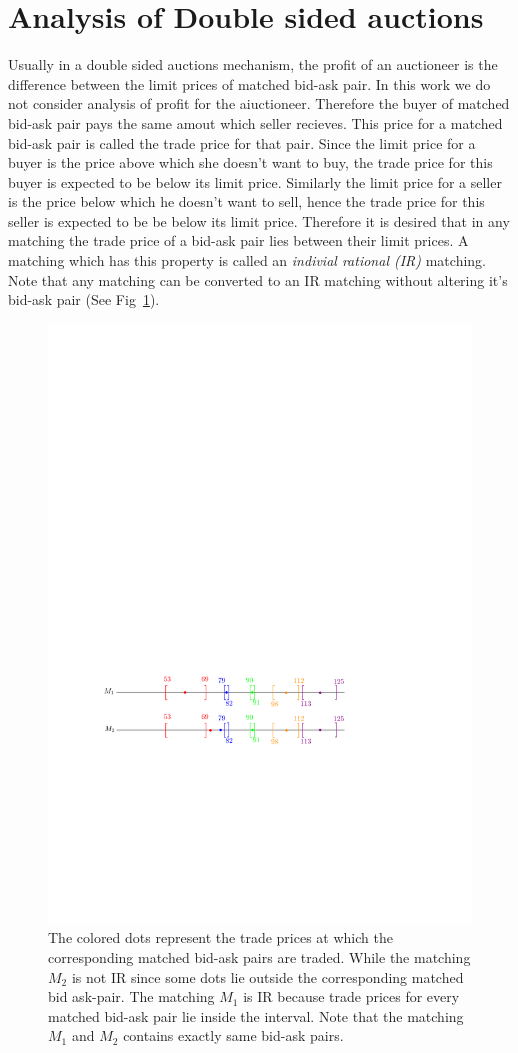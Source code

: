 \documentclass[a4paper,UKenglish,cleveref, autoref]{lipics-v2019}
\begin{document}
\section{Analysis of Double sided auctions}
Usually in a double sided auctions mechanism, the profit of an auctioneer is the difference between the limit prices of matched bid-ask pair. In this work we do not consider analysis of profit for the aiuctioneer. Therefore the buyer of matched bid-ask pair pays the same amout which seller recieves. This price for a matched  bid-ask pair is called the trade price for that pair. Since the limit price for a buyer is the price above which she doesn't want to buy, the trade price for this buyer is expected to be below its limit price. Similarly the limit price for a seller is the price below which he doesn't want to sell, hence the trade price for this seller is expected to be be below its limit price. Therefore it is desired that in any matching the trade price of a bid-ask pair lies between their limit prices. A matching which has this property is called an \emph{indivial rational (IR)} matching. Note that any matching can be converted to an IR matching without altering it's bid-ask pair (See Fig~\ref{fig:IR}).

\begin{figure}[h!]
\centering
\includegraphics[width=.8\textwidth]{brack_IR.pdf}
\caption{ The colored dots represent the trade prices at which the corresponding matched bid-ask pairs are traded. While the matching $M_2$ is not IR since some dots lie outside the corresponding matched bid ask-pair. The matching $M_1$ is IR because trade prices for every matched bid-ask pair  lie inside the interval. Note that the matching $M_1$ and $M_2$ contains exactly same bid-ask pairs.}
\label{fig:IR}
\end{figure}
\end{document}
